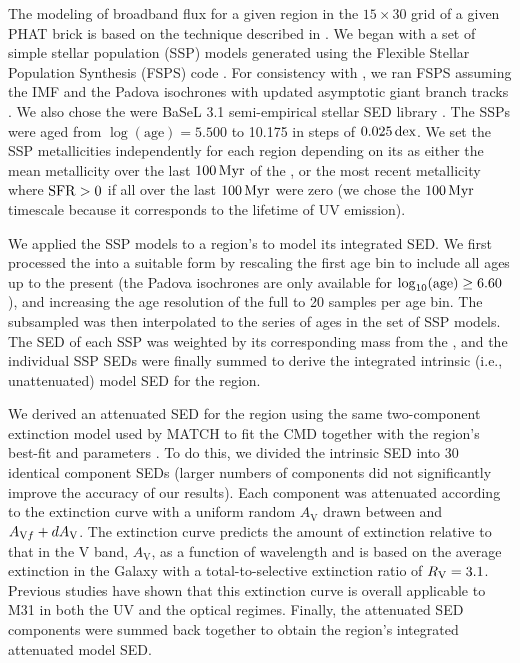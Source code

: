 \documentclass[iop, tighten]{emulateapj}
\begin{document}
The modeling of broadband flux for a given region in the $15 \times 30$ grid of
a given PHAT brick is based on the technique described in \citet{Johnson:2013}.
We began with a set of simple stellar population (SSP) models generated using
the Flexible Stellar Population Synthesis (FSPS) code \citep{Conroy:2009,
Conroy:2010}. For consistency with \citet{Lewis:2014}, we ran FSPS assuming the
\citet{Kroupa:2001} IMF and the Padova isochrones \citep{Marigo:2008} with
updated asymptotic giant branch tracks \citep{Girardi:2010}. We also chose the
were BaSeL 3.1 semi-empirical stellar SED library \citep{Westera:2002}. The
SSPs were aged from $\log(\mathrm{age})=5.500$ to 10.175 in steps of
$0.025\,\mathrm{dex}$. We set the SSP metallicities independently for each region
depending on its \sfh{} as either the mean metallicity over the last $100\,\mathrm{Myr}$
of the \sfh{}, or the most recent metallicity where $\mathrm{SFR} > 0$ if all 
over the last $100\,\mathrm{Myr}$ were zero (we chose the $100\,\mathrm{Myr}$ timescale because it
corresponds to the lifetime of UV emission).

We applied the SSP models to a region's \sfh{} to model its integrated SED. We
first processed the \sfh{} into a suitable form by rescaling the first age bin
to include all ages up to the present (the Padova isochrones are only available
for $\log_{10}(\mathrm{age}) \ge 6.60$), and increasing the age resolution of the
full \sfh{} to 20 samples per age bin. The subsampled \sfh{} was then
interpolated to the series of ages in the set of SSP models. The SED of each
SSP was weighted by its corresponding mass from the \sfh{}, and the individual
SSP SEDs were finally summed to derive the integrated intrinsic (i.e.,
unattenuated) model SED for the region.

\figmodfluxmapsfuv

\figmodfluxmapsnuv

We derived an attenuated SED for the region using the same two-component
extinction model used by MATCH to fit the CMD together with the region's
best-fit \avf{} and \dav{} parameters \citep{Lewis:2014}. To do this, we
divided the intrinsic SED into 30 identical component SEDs (larger numbers of
components did not significantly improve the accuracy of our results). Each
component was attenuated according to the \citet{Cardelli:1989} extinction
curve with a uniform random $A_\mathrm{V}$ drawn between \avf{} and $A_{\mathrm{V}f} +
dA_\mathrm{V}$. The \citet{Cardelli:1989} extinction curve predicts the amount of
extinction relative to that in the V band, $A_\mathrm{V}$, as a function of
wavelength and is based on the average extinction in the Galaxy with a
total-to-selective extinction ratio of $R_\mathrm{V} = 3.1$. Previous studies have shown
that this extinction curve is overall applicable to M31 in both the UV
\citep{Bianchi:1996} and the optical \citep{Barmby:2000} regimes. Finally, the
attenuated SED components were summed back together to obtain the region's
integrated attenuated model SED.
\end{document}
